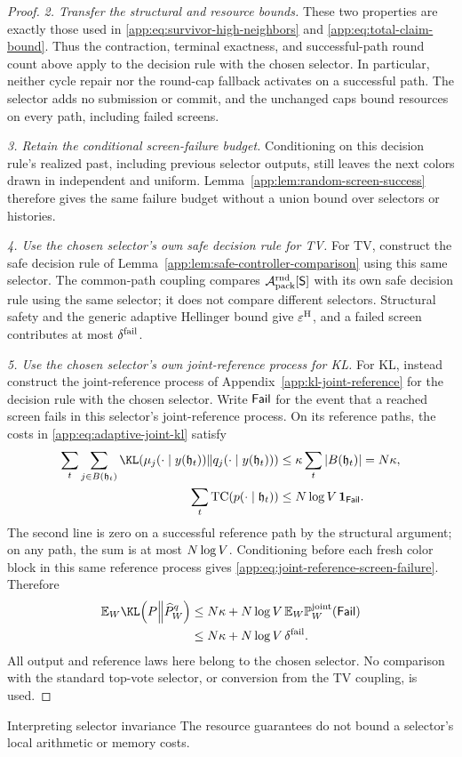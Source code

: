 \begin{proof}
\emph{2. Transfer the structural and resource bounds.}
These two properties are exactly those used in
\eqref{app:eq:survivor-high-neighbors} and
\eqref{app:eq:total-claim-bound}.  Thus the contraction, terminal exactness,
and successful-path round count above apply to the decision rule with
the chosen selector.
In particular, neither cycle repair nor the round-cap fallback activates
on a successful path.
The selector adds no submission or commit, and the unchanged caps bound
resources on every path, including failed screens.


\emph{3. Retain the conditional screen-failure budget.}
Conditioning on this decision rule's realized past, including previous
selector outputs, still leaves the next colors drawn in 
independent and uniform.  Lemma~\ref{app:lem:random-screen-success} therefore gives the
same failure budget without a union bound over selectors or histories.

\emph{4. Use the chosen selector's own safe decision rule for TV.}
For TV, construct the safe decision rule of
Lemma~\ref{app:lem:safe-controller-comparison} using this same selector.
The common-path coupling compares $\mathcal A_{\mathrm{pack}}^{\mathrm{rnd}}[\mathsf S]$ with its own
safe decision rule using the same selector; it does not compare different
selectors.  Structural safety and the generic adaptive Hellinger bound
give $\varepsilon^{\mathrm H}$, and a failed screen contributes at most
$\delta^{\mathrm{fail}}$.


\emph{5. Use the chosen selector's own joint-reference process for KL.}
For KL, instead construct the joint-reference process of
Appendix~\ref{app:kl-joint-reference} for the decision rule with the chosen
selector.  Write $\mathsf{Fail}$ for the event that a reached
screen fails in this selector's joint-reference process.
On its reference paths, the costs in
\eqref{app:eq:adaptive-joint-kl} satisfy
\begin{align*}
 \sum_t\sum_{j\in B(\mathfrak h_t)}
  \KLDivergence{\ExactRow{y(\mathfrak h_t)}{j}}
               {\OracleRow{y(\mathfrak h_t)}{j}}
 &\le\KLRowBudget\sum_t|B(\mathfrak h_t)|=N\KLRowBudget,\\
 \sum_t\mathrm{TC}(\JointBatchLaw{\mathfrak h_t})
 &\le N\log\VocabSize\,\mathbf 1_{\ScreenFailureEvent}.
\end{align*}
The second line is zero on a successful reference path by the structural
argument; on any path, the sum is at most $N\log V$.
Conditioning before each fresh color block in this same reference process
gives \eqref{app:eq:joint-reference-screen-failure}.  Therefore
\begin{align*}
 \mathbb E_W\KLDivergence{\TargetLaw}{\SamplerOutputLaw{W}{\FrozenOracle}}
 &\le N\KLRowBudget+
       N\log\VocabSize\,\mathbb E_W\JointReferenceLaw{W}(\ScreenFailureEvent)\\
 &\le N\KLRowBudget+N\log\VocabSize\,\ScreenFailureBudget.
\end{align*}
All output and reference laws here belong to the chosen selector.
No comparison with the standard top-vote selector, or conversion from the
TV coupling, is used.
\end{proof}

\begin{proposalcontext}{Interpreting selector invariance}
The resource guarantees do not bound a selector's local arithmetic or
memory costs.
\end{proposalcontext}
